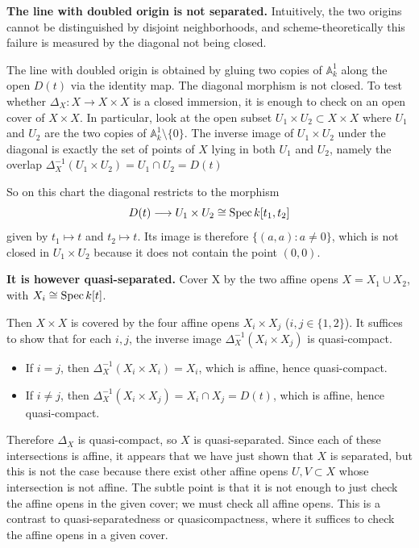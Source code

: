 \documentclass[12pt]{article}
\begin{document}
\begin{example}
    \textbf{The line with doubled origin is not separated.} Intuitively, the two origins cannot be distinguished by disjoint neighborhoods, and scheme-theoretically this failure is measured by the diagonal not being closed.

    The line with doubled origin is obtained by gluing two copies of $\mathbb A^1_k$ along the open $D(t)$ via the identity map. The diagonal morphism is not closed. To test whether $\Delta_X:X\to X\times X$ is a closed immersion, it is enough to check on an open cover of $X\times X$. In particular, look at the open subset $U_1\times U_2 \subset X\times X$ where $U_1$ and $U_2$ are the two copies of $\mathbb A^1_k \setminus \{0\}$. The inverse image of $U_1\times U_2$ under the diagonal is exactly the set of points of $X$ lying in both $U_1$ and $U_2$, namely the overlap $\Delta_X^{-1}(U_1\times U_2)=U_1\cap U_2 = D(t)$

    So on this chart the diagonal restricts to the morphism
    \[
        D(t)\longrightarrow U_1\times U_2 \cong \operatorname{Spec} k[t_1,t_2]
    \]
    given by $t_1\mapsto t$ and $t_2\mapsto t$. Its image is therefore $\{(a,a): a\neq 0\}$, which is not closed in $U_1\times U_2$ because it does not contain the point $(0,0)$.

    \textbf{It is however quasi-separated.} Cover X by the two affine opens $X = X_1 \cup X_2$, with $X_i \cong \operatorname{Spec} k[t]$.

    Then $X \times X$ is covered by the four affine opens $X_i \times X_j$ ($i,j\in\{1,2\}$).
    It suffices to show that for each $i,j$, the inverse image
    $\Delta_X^{-1}(X_i \times X_j)$ is quasi-compact.

    \begin{itemize}
        \item If $i=j$, then
              $\Delta_X^{-1}(X_i \times X_i)=X_i$,
              which is affine, hence quasi-compact.

        \item If $i\neq j$, then
              $\Delta_X^{-1}(X_i \times X_j)=X_i\cap X_j=D(t)$,
              which is affine, hence quasi-compact.
    \end{itemize}
    Therefore $\Delta_X$ is quasi-compact, so $X$ is quasi-separated. Since each of these intersections is affine, it appears that we have just shown that $X$ is separated, but this is not the case because there exist other affine opens $U,V \subset X$ whose intersection is not affine. The subtle point is that it is not enough to just check the affine opens in the given cover; we must check all affine opens. This is a contrast to quasi-separatedness or quasicompactness, where it suffices to check the affine opens in a given cover.
\end{example}
\end{document}
